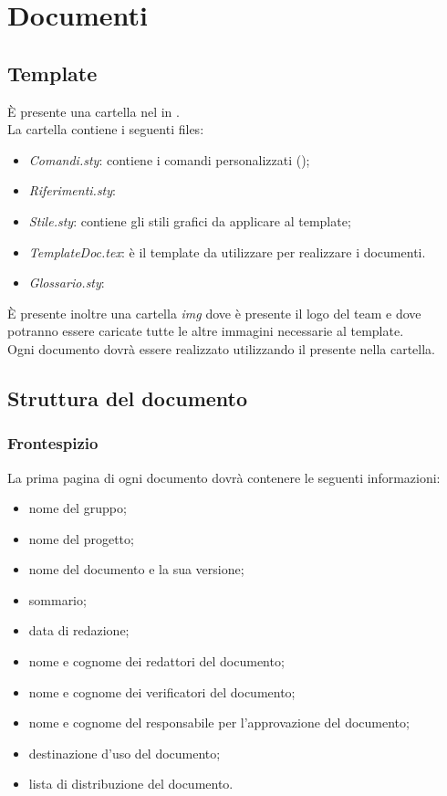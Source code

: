 \section{Documenti}
	\subsection{Template}
		È presente una cartella nel  in . \\
		La cartella contiene i seguenti files:
		\begin{itemize}
			\item \textit{Comandi.sty}: contiene i comandi personalizzati (\gl);
			\item \textit{Riferimenti.sty}: %
			\item \textit{Stile.sty}: contiene gli stili grafici da applicare al template;
			\item \textit{TemplateDoc.tex}: è il template da utilizzare per realizzare i documenti.
			\item \textit{Glossario.sty}: %
		\end{itemize}
		È presente inoltre una cartella \textit{img} dove è presente il logo del team e dove potranno essere caricate tutte le altre immagini necessarie al template. \\
		Ogni documento dovrà essere realizzato utilizzando il  presente nella cartella.
	\subsection{Struttura del documento}
		\subsubsection{Frontespizio}
		La prima pagina di ogni documento dovrà contenere le seguenti informazioni:
		\begin{itemize}
			\item nome del gruppo;
			\item nome del progetto;
			\item nome del documento e la sua versione;
			\item sommario;
			\item data di redazione;
			\item nome e cognome dei redattori del documento;
			\item nome e cognome dei verificatori del documento;
			\item nome e cognome del responsabile per l'approvazione del documento;
			\item destinazione d'uso del documento;
			\item lista di distribuzione del documento.
		\end{itemize}
